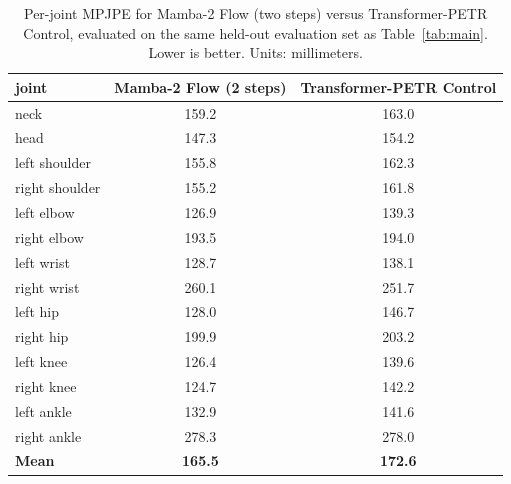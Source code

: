 \begin{table}[!ht]
\caption{Per-joint MPJPE for Mamba-2 Flow (two steps) versus Transformer-PETR Control,
evaluated on the same held-out evaluation set as
Table~\ref{tab:main}. Lower is better. Units: millimeters.}
\label{tab:per-joint}
\centering
\begin{tabular}{l c c}
\toprule
joint & Mamba-2 Flow (2 steps) & Transformer-PETR Control \\
\midrule
    neck & 159.2 & 163.0 \\
    head & 147.3 & 154.2 \\
    left shoulder & 155.8 & 162.3 \\
    right shoulder & 155.2 & 161.8 \\
    left elbow & 126.9 & 139.3 \\
    right elbow & 193.5 & 194.0 \\
    left wrist & 128.7 & 138.1 \\
    right wrist & 260.1 & 251.7 \\
    left hip & 128.0 & 146.7 \\
    right hip & 199.9 & 203.2 \\
    left knee & 126.4 & 139.6 \\
    right knee & 124.7 & 142.2 \\
    left ankle & 132.9 & 141.6 \\
    right ankle & 278.3 & 278.0 \\
    \midrule
    \textbf{Mean} & \textbf{165.5} & \textbf{172.6} \\
\bottomrule
\end{tabular}
\end{table}
